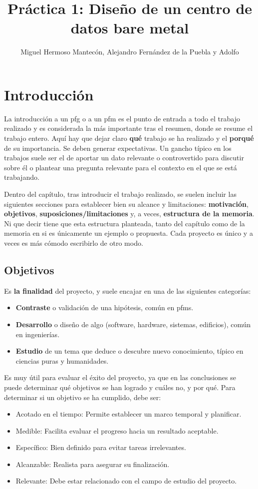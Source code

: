 \documentclass[%
    school=etsisi,%
    degree=61TI,%
]{upm-report}
\title{Práctica 1: Diseño de un centro de datos bare metal}
\author{Miguel Hermoso Mantecón, Alejandro Fernández de la Puebla y Adolfo}
\begin{document}
\chapter{Introducción}
\label{ch:introduccion}

La introducción a un \gls{pfg} o a un \gls{pfm} es el punto de entrada a
todo el trabajo realizado y es considerada la más importante tras el
resumen, donde se resume el trabajo entero. Aquí hay que dejar claro
\textbf{qué} trabajo se ha realizado y el \textbf{porqué} de su
importancia. Se deben generar expectativas. Un gancho típico en los
trabajos suele ser el de aportar un dato relevante o controvertido para
discutir sobre él o plantear una pregunta relevante para el contexto en
el que se está trabajando.

Dentro del capítulo, tras introducir el trabajo realizado, se suelen
incluir las siguientes secciones para establecer bien su alcance y
limitaciones: \textbf{motivación}, \textbf{objetivos},
\textbf{suposiciones/limitaciones} y, a veces,
\textbf{estructura de la memoria}. Ni que decir tiene que esta
estructura planteada, tanto del capítulo como de la memoria en si es
únicamente un ejemplo o propuesta. Cada proyecto es único y a veces es
más cómodo escribirlo de otro modo.

\section{Objetivos}

Es \textbf{la finalidad} del proyecto, y suele encajar en una de las
siguientes categorías:

\begin{itemize}
    \item \textbf{Contraste} o validación de una hipótesis, común en
        \glspl{pfm}.
    \item \textbf{Desarrollo} o diseño de algo (software, hardware,
        sistemas, edificios), común en ingenierías.
    \item \textbf{Estudio} de un tema que deduce o descubre nuevo
        conocimiento, típico en ciencias puras y humanidades.
\end{itemize}

Es muy útil para evaluar el éxito del proyecto, ya que en las
conclusiones se puede determinar qué objetivos se han logrado y cuáles
no, y por qué. Para determinar si un objetivo se ha cumplido, debe ser:

\begin{itemize}
    \item Acotado en el tiempo: Permite establecer un marco temporal y
        planificar.
    \item Medible: Facilita evaluar el progreso hacia un resultado
        aceptable.
    \item Específico: Bien definido para evitar tareas irrelevantes.
    \item Alcanzable: Realista para asegurar su finalización.
    \item Relevante: Debe estar relacionado con el campo de estudio del
        proyecto.
\end{itemize}
\end{document}
